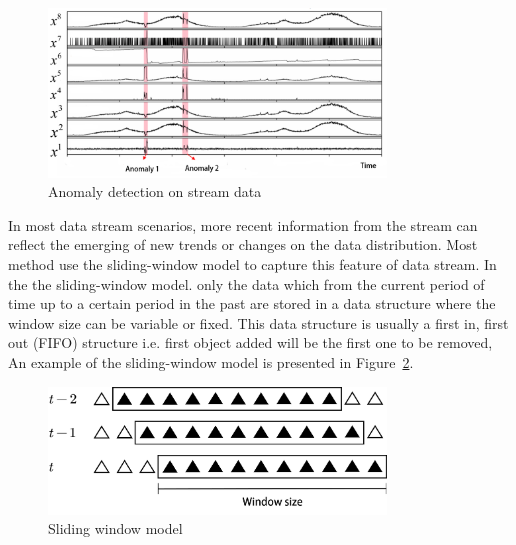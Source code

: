 \begin{figure}
  \centering
  \includegraphics[width=0.8\textwidth]{figures/streamAnomaly.png}
  \caption{Anomaly detection on stream data}\label{fig:streamAnomaly}
\end{figure}

In most data stream scenarios,
more recent information from the stream can reflect the
emerging of new trends or changes on the data distribution.
Most method use the sliding-window model to 
capture this feature of data stream.
In the the sliding-window model.
only the data which from the current period of time 
up to a certain period in the past
are stored in a data structure 
where the window size can be variable
or fixed.
This data structure is usually a first in,
first out (FIFO) structure i.e. first object added will be the first one to be removed,
An example of the sliding-window model is presented in Figure~\ref{fig:slidingWindow}.
\begin{figure}
  \centering
  \includegraphics[width=0.8\textwidth]{figures/slideWindow.png}
  \caption{Sliding window model}\label{fig:slidingWindow}
\end{figure}


